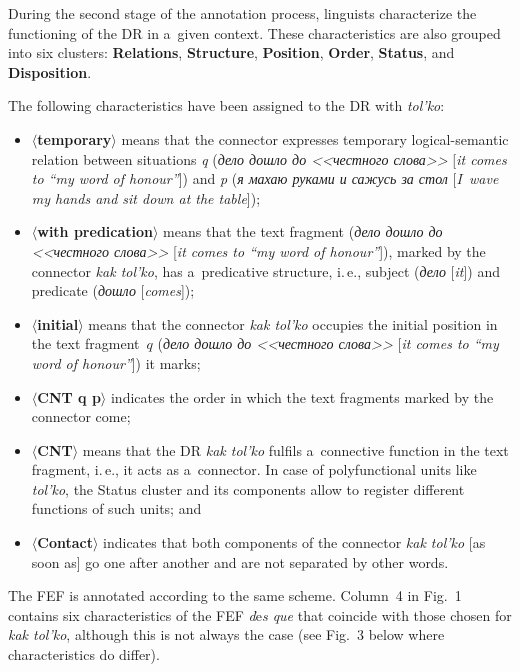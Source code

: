 \begin{multicols}{2}
  During the second stage of the annotation process, linguists characterize the 
functioning of the DR in a~given context. These characteristics are also grouped 
into six clusters: \textbf{Relations}, \textbf{Structure}, \textbf{Position}, 
\textbf{Order}, \textbf{Status}, and \textbf{Disposition}.
  
The following characteristics have been assigned to the DR with \textit{tol'ko}:
\begin{itemize}
\item $\langle$\textbf{temporary}$\rangle$ means that the connector expresses temporary  
logical-semantic relation between situations \textit{q} (\textit{дело дошло
до <<честного слова>>} [\textit{it comes to ``my word of honour''}]) and 
\textit{p} (\textit{я махаю руками и сажусь за стол} [\textit{I~wave my 
hands and sit down at the table}]);
\item $\langle$\textbf{with predication}$\rangle$ means that the text 
fragment (\textit{дело дошло до <<честного слова>>} [\textit{it comes to 
``my word of honour''}]), marked by the connector \textit{kak tol'ko}, has 
a~predicative structure, i.\,e., subject (\textit{дело} [\textit{it}]) and predicate 
(\textit{дошло} [\textit{comes}]);
\item $\langle$\textbf{initial}$\rangle$ means that the connector \textit{kak 
tol'ko} occupies the initial position in the text fragment~$q$ (\textit{дело 
дошло до <<честного слова>>} [\textit{it comes to ``my word of honour''}]) 
it marks;
\item $\langle$\textbf{CNT q p}$\rangle$ indicates the order in which the 
text fragments marked by the connector come;
\item $\langle$\textbf{CNT}$\rangle$ means that the DR \textit{kak tol'ko} 
fulfils a~connective function in the text fragment, i.\,e., it acts as a~connector. In 
case of polyfunctional units like \textit{tol'ko}, the Status cluster and its 
components allow to register different functions of such units; and
\item $\langle$\textbf{Contact}$\rangle$ indicates that both components of 
the connector \textit{kak tol'ko} [as soon as] go one after another and 
are not separated by other words.
  \end{itemize}
  

  
  The FEF is annotated according to the same scheme. Column~4 in Fig.~1 
contains six characteristics of the FEF \textit{d$\grave{\mbox{e}}$s que} that 
coincide with those chosen for \textit{kak tol'ko}, although this is not always the 
case (see Fig.~3 below where characteristics do differ).
  

\end{multicols}
